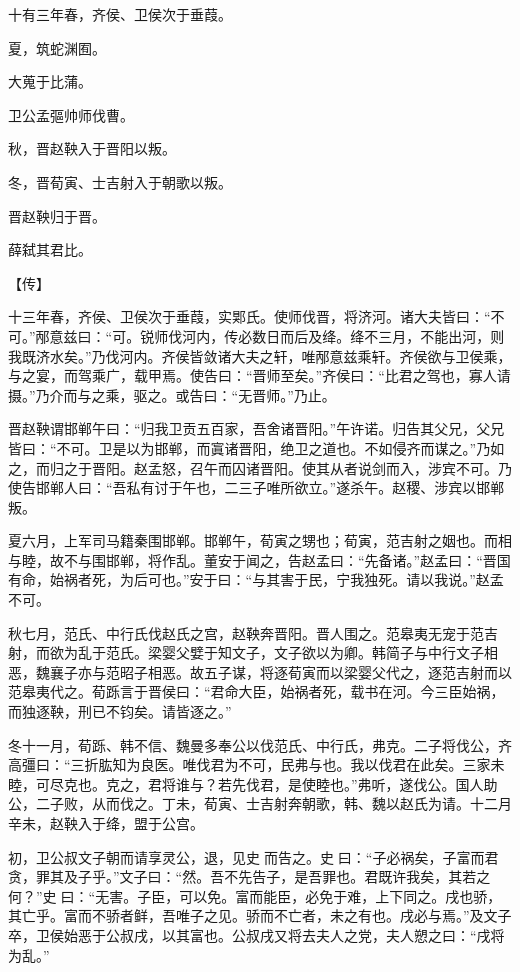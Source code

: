 \documentclass[a4paper,12pt,UTF8,twoside]{ctexbook}
\begin{document}
十有三年春，齐侯、卫侯次于垂葭。

夏，筑蛇渊囿。

大蒐于比蒲。

卫公孟彄帅师伐曹。

秋，晋赵鞅入于晋阳以叛。

冬，晋荀寅、士吉射入于朝歌以叛。

晋赵鞅归于晋。

薛弑其君比。

【传】

十三年春，齐侯、卫侯次于垂葭，实郹氏。使师伐晋，将济河。诸大夫皆曰：“不可。”邴意兹曰：“可。锐师伐河内，传必数日而后及绛。绛不三月，不能出河，则我既济水矣。”乃伐河内。齐侯皆敛诸大夫之轩，唯邴意兹乘轩。齐侯欲与卫侯乘，与之宴，而驾乘广，载甲焉。使告曰：“晋师至矣。”齐侯曰：“比君之驾也，寡人请摄。”乃介而与之乘，驱之。或告曰：“无晋师。”乃止。

晋赵鞅谓邯郸午曰：“归我卫贡五百家，吾舍诸晋阳。”午许诺。归告其父兄，父兄皆曰：“不可。卫是以为邯郸，而寘诸晋阳，绝卫之道也。不如侵齐而谋之。”乃如之，而归之于晋阳。赵孟怒，召午而囚诸晋阳。使其从者说剑而入，涉宾不可。乃使告邯郸人曰：“吾私有讨于午也，二三子唯所欲立。”遂杀午。赵稷、涉宾以邯郸叛。

夏六月，上军司马籍秦围邯郸。邯郸午，荀寅之甥也；荀寅，范吉射之姻也。而相与睦，故不与围邯郸，将作乱。董安于闻之，告赵孟曰：“先备诸。”赵孟曰：“晋国有命，始祸者死，为后可也。”安于曰：“与其害于民，宁我独死。请以我说。”赵孟不可。

秋七月，范氏、中行氏伐赵氏之宫，赵鞅奔晋阳。晋人围之。范皋夷无宠于范吉射，而欲为乱于范氏。梁婴父嬖于知文子，文子欲以为卿。韩简子与中行文子相恶，魏襄子亦与范昭子相恶。故五子谋，将逐荀寅而以梁婴父代之，逐范吉射而以范皋夷代之。荀跞言于晋侯曰：“君命大臣，始祸者死，载书在河。今三臣始祸，而独逐鞅，刑已不钧矣。请皆逐之。”

冬十一月，荀跞、韩不信、魏曼多奉公以伐范氏、中行氏，弗克。二子将伐公，齐高彊曰：“三折肱知为良医。唯伐君为不可，民弗与也。我以伐君在此矣。三家未睦，可尽克也。克之，君将谁与？若先伐君，是使睦也。”弗听，遂伐公。国人助公，二子败，从而伐之。丁未，荀寅、士吉射奔朝歌，韩、魏以赵氏为请。十二月辛未，赵鞅入于绛，盟于公宫。

初，卫公叔文子朝而请享灵公，退，见史而告之。史曰：“子必祸矣，子富而君贪，罪其及子乎。”文子曰：“然。吾不先告子，是吾罪也。君既许我矣，其若之何？”史曰：“无害。子臣，可以免。富而能臣，必免于难，上下同之。戌也骄，其亡乎。富而不骄者鲜，吾唯子之见。骄而不亡者，未之有也。戌必与焉。”及文子卒，卫侯始恶于公叔戌，以其富也。公叔戌又将去夫人之党，夫人愬之曰：“戌将为乱。”
\end{document}
